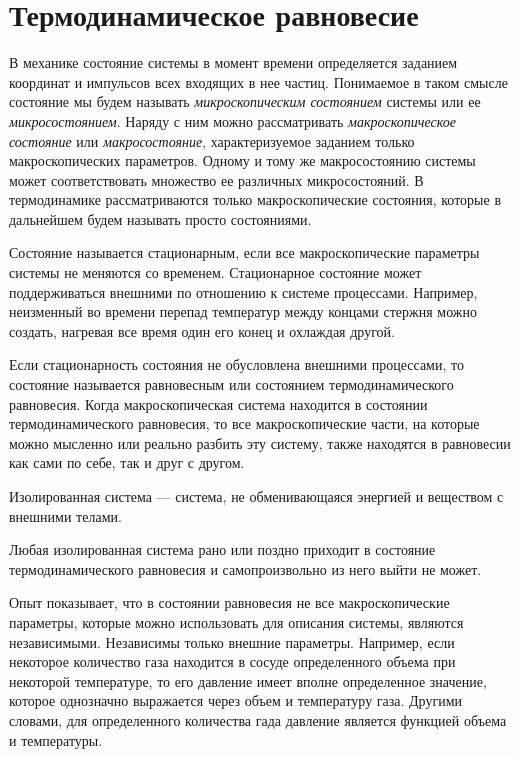 \section{Термодинамическое равновесие}

В механике состояние системы в момент времени определяется заданием координат и импульсов всех входящих в нее частиц. Понимаемое в таком смысле состояние мы будем называть \textit{микроскопическим состоянием} системы или ее \textit{микросостоянием}. Наряду с ним можно рассматривать \textit{макроскопическое состояние} или \textit{макросостояние}, характеризуемое заданием только макроскопических параметров. Одному и тому же макросостоянию системы может соответствовать множество ее различных микросостояний. В термодинамике рассматриваются только макроскопические состояния, которые в дальнейшем будем называть просто состояниями. \par
Состояние называется стационарным, если все макроскопические параметры системы не меняются со временем. Стационарное состояние может поддерживаться внешними по отношению к системе процессами. Например, неизменный во времени перепад температур между концами стержня можно создать, нагревая все время один его конец и охлаждая другой. \par
Если стационарность состояния не обусловлена внешними процессами, то состояние называется равновесным или состоянием термодинамического равновесия. Когда макроскопическая система находится в состоянии термодинамического равновесия, то все макроскопические части, на которые можно мысленно или реально разбить эту систему, также находятся в равновесии как сами по себе, так и друг с другом.\par
  Изолированная система --- система, не обменивающаяся энергией и веществом с внешними телами.
\begin{post}
	Любая изолированная система рано или поздно приходит в состояние термодинамического равновесия и самопроизвольно из него выйти не может.
\end{post}
Опыт показывает, что в состоянии равновесия не все макроскопические параметры, которые можно использовать для описания системы, являются независимыми. Независимы только внешние параметры. Например, если некоторое количество газа находится в сосуде определенного объема при некоторой температуре, то его давление имеет вполне определенное значение, которое однозначно выражается через объем и температуру газа. Другими словами, для определенного количества гада давление является функцией объема и температуры.